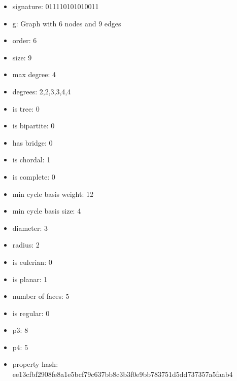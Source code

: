 \begin{itemize}
\item signature: 011110101010011
\item g: Graph with 6 nodes and 9 edges
\item order: 6
\item size: 9
\item max degree: 4
\item degrees: 2,2,3,3,4,4
\item is tree: 0
\item is bipartite: 0
\item has bridge: 0
\item is chordal: 1
\item is complete: 0
\item min cycle basis weight: 12
\item min cycle basis size: 4
\item diameter: 3
\item radius: 2
\item is eulerian: 0
\item is planar: 1
\item number of faces: 5
\item is regular: 0
\item p3: 8
\item p4: 5
\item property hash: ee13cfbf2908fe8a1e5bcf79c637bb8c3b3f0e9bb783751d5dd737357a5faab4
\end{itemize}
\newpage
